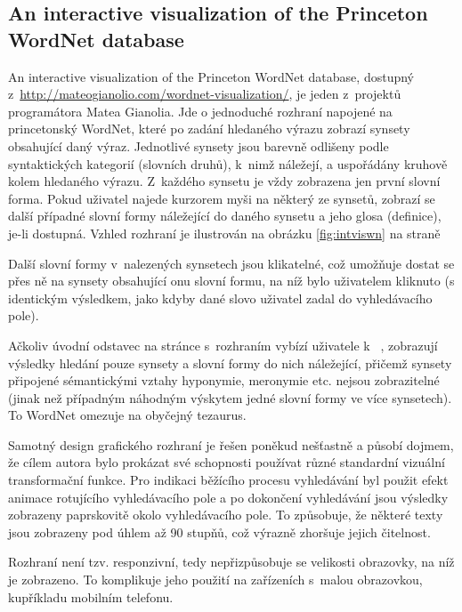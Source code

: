 \documentclass[a4paper,11pt,openany,twoside]{book}
\begin{document}
				\subsection{An interactive visualization of the Princeton WordNet database}
				\label{wnvis:intviswn}

					An interactive visualization of the Princeton WordNet database, dostupný z~\url{http://mateogianolio.com/wordnet-visualization/}, je jeden z~projektů programátora Matea Gianolia. Jde o jednoduché rozhraní napojené na princetonský WordNet, které po zadání hledaného výrazu zobrazí synsety obsahující daný výraz. Jednotlivé synsety jsou barevně odlišeny podle syntaktických kategorií (slovních druhů), k~nimž náležejí, a uspořádány kruhově kolem hledaného výrazu. Z~každého synsetu je vždy zobrazena jen první slovní forma. Pokud uživatel najede kurzorem myši na některý ze synsetů, zobrazí se další případné slovní formy náležející do daného synsetu a jeho glosa (definice), je-li dostupná. Vzhled rozhraní je ilustrován na obrázku \ref{fig:intviswn} na straně \pageref{fig:intviswn}

					Další slovní formy v~nalezených synsetech jsou klikatelné, což umožňuje dostat se přes ně na synsety obsahující onu slovní formu, na níž bylo uživatelem kliknuto (s identickým výsledkem, jako kdyby dané slovo uživatel zadal do vyhledávacího pole).

					Ačkoliv úvodní odstavec na stránce s~rozhraním vybízí uživatele k~ \parencite{GianolioWN}, zobrazují výsledky hledání pouze synsety a slovní formy do nich náležející, přičemž synsety připojené sémantickými vztahy hyponymie, meronymie etc. nejsou zobrazitelné (jinak než případným náhodným výskytem jedné slovní formy ve více synsetech). To WordNet omezuje na obyčejný tezaurus.

					Samotný design grafického rozhraní je řešen poněkud nešťastně a působí dojmem, že cílem autora bylo prokázat své schopnosti používat různé standardní vizuální transformační funkce. Pro indikaci běžícího procesu vyhledávání byl použit efekt animace rotujícího vyhledávacího pole a po dokončení vyhledávání jsou výsledky zobrazeny paprskovitě okolo vyhledávacího pole. To způsobuje, že některé texty jsou zobrazeny pod úhlem až 90 stupňů, což výrazně zhoršuje jejich čitelnost.  %

					Rozhraní není tzv. responzivní, tedy nepřizpůsobuje se velikosti obrazovky, na níž je zobrazeno. To komplikuje jeho použití na zařízeních s~malou obrazovkou, kupříkladu mobilním telefonu.
\end{document}
